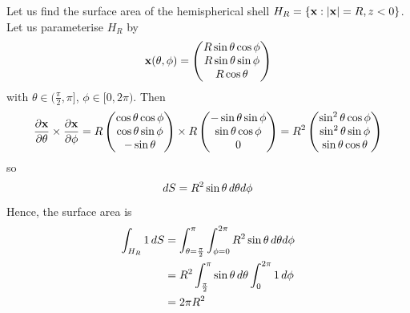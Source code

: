 \documentclass{../../template/note}
\begin{document}
    \begin{example*}
        Let us find the surface area of the hemispherical shell \(H_R = \{\V x: |\V x| = R, z < 0\}\). Let us parameterise \(H_R\) by
        \begin{align*}
            \V x(\theta, \phi) = \begin{pmatrix}
             R \sin \theta \cos \phi \\
             R \sin \theta \sin \phi \\
             R \cos \theta \\
            \end{pmatrix}
        \end{align*}
        with \(\theta \in (\frac{\pi}2, \pi]\), \(\phi \in [0, 2\pi)\). Then
        \begin{align*}
            \pd{\V x}\theta \times \pd{\V x}\phi = R \begin{pmatrix}
             \cos \theta \cos \phi \\
             \cos \theta \sin \phi \\
             -\sin \theta \\
            \end{pmatrix} \times R \begin{pmatrix}
             -\sin \theta \sin \phi \\
             \sin \theta \cos \phi \\
             0 \\
            \end{pmatrix} = R^2 \begin{pmatrix}
             \sin^2 \theta \cos \phi \\
             \sin^2 \theta \sin \phi \\
             \sin \theta \cos \theta \\
            \end{pmatrix}
        \end{align*}
        so
        \begin{align*}
            dS = R^2 \sin \theta \,d{\theta} d\phi
        \end{align*}
        Hence, the surface area is
        \begin{align*}
            \int_{H_R} 1 \,d{S} &= \int_{\theta = \frac{\pi}{2}}^\pi \int_{\phi=0}^{2 \pi} R^2 \sin \theta \,d{\theta} d \phi \\
            &= R^2 \int_{\frac{\pi}{2}}^\pi \sin \theta \,d{\theta} \int_0^{2\pi} 1 \,d{\phi} \\
            &= 2\pi R^2
        \end{align*}
    \end{example*}
    
\end{document}
